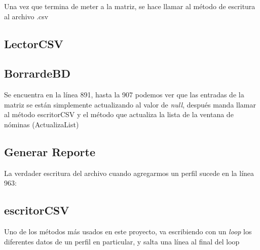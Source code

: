 \documentclass[12pt]{article}
\begin{document}
{Una vez que termina de meter a la matriz, se hace llamar al m\'etodo de escritura al archivo .csv}

\subsection{LectorCSV}

\subsection{BorrardeBD}
{Se encuentra en la l\'inea 891, hasta la 907 podemos ver que las entradas de la matriz se est\'an simplemente actualizando al valor de \textit{null}, despu\'es manda llamar al m\'etodo escritorCSV y el m\'etodo que actualiza la lista de la ventana de n\'ominas (ActualizaList)}

\subsection{Generar Reporte}
{La verdader escritura del archivo cuando agregarmos un perfil sucede en la l\'inea 963:}


\subsection{escritorCSV}
{Uno de los m\'etodos m\'as usados en este proyecto, va escribiendo con un \textit{loop} los diferentes datos de un perfil en particular, y salta una l\'inea al final del loop}


\end{document}
